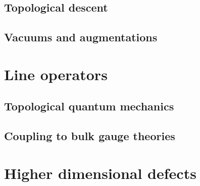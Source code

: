 \documentclass[11pt]{amsart}
\begin{document}

\subsection{Topological descent} 

\subsection{Vacuums and augmentations}

\section{Line operators}


\subsection{Topological quantum mechanics}


\subsection{Coupling to bulk gauge theories}


\section{Higher dimensional defects} 

\end{document}
